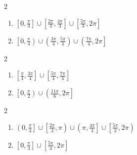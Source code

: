 \documentclass{ximera}
\begin{document}
\begin{multicols}{2}

\begin{enumerate}

\setcounter{enumi}{\value{HW}}

\item $\left[ 0, \frac{\pi}{3} \right] \cup \left[ \frac{2\pi}{3}, \frac{4\pi}{3} \right] \cup \left[ \frac{5\pi}{3}, 2\pi \right]$
\item $\left[ 0, \frac{\pi}{4} \right) \cup \left( \frac{3\pi}{4}, \frac{5\pi}{4} \right) \cup \left( \frac{7\pi}{4}, 2\pi \right]$

\setcounter{HW}{\value{enumi}}

\end{enumerate}

\end{multicols}

\begin{multicols}{2}

\begin{enumerate}

\setcounter{enumi}{\value{HW}}

\item $\left[ \frac{\pi}{4}, \frac{3\pi}{4} \right] \cup \left[ \frac{5\pi}{4}, \frac{7\pi}{4} \right]$
\item $\left[ 0, \frac{\pi}{2} \right) \cup \left( \frac{11\pi}{6}, 2\pi \right]$

\setcounter{HW}{\value{enumi}}

\end{enumerate}

\end{multicols}

\begin{multicols}{2}

\begin{enumerate}

\setcounter{enumi}{\value{HW}}

\item \small $\left( 0, \frac{\pi}{3} \right] \cup \left[ \frac{2\pi}{3}, \pi \right) \cup \left( \pi, \frac{4\pi}{3} \right] \cup \left[ \frac{5\pi}{3}, 2\pi \right)$ \normalsize
\item  $\left[0, \frac{\pi}{3}\right] \cup \left[\frac{5\pi}{3}, 2\pi\right]$

\setcounter{HW}{\value{enumi}}

\end{enumerate}

\end{multicols}
\end{document}
